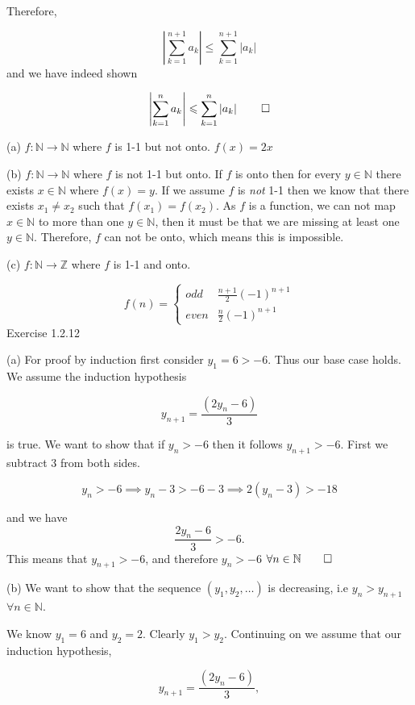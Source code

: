 \documentclass{report}
\begin{document}
Therefore,

$$
\left|\sum_{k=1}^{n+1} a_{k}\right| \leq \sum_{k=1}^{n+1}\left|a_{k}\right| $$  and we have indeed shown

$$
\left|\sum_{k=1}^{n} a_{k}\right| \leq \sum_{k=1}^{n}\left|a_{k}\right| \qed$$

\bigskip
{}
(a) $f: \mathbb{N} \rightarrow \mathbb{N}$ where $f$ is 1-1 but not onto. 
\sol  $f(x) = 2x$
\par
(b) $f: \mathbb{N} \rightarrow \mathbb{N}$ where $f$ is not 1-1 but onto. 
\sol If $f$ is onto then for every $y \in \mathbb{N}$ there exists $x \in \mathbb{N}$ where $f(x) = y$. If we assume $f$  is \textit{not} 1-1 then we know that there exists $x_1 \neq x_2$ such that $f(x_1) = f(x_2)$. As $f$ is a function, we can not map $x \in \mathbb{N}$ to more than one $y \in \mathbb{N}$, then it must be that we are missing at least one $y \in \mathbb{N}$. Therefore, $f$ can not be onto, which means this is impossible.

(c) $f: \mathbb{N} \rightarrow \mathbb{Z}$ where $f$ is 1-1 and onto. 

\sol  
\[ 
 f(n) = 
  \begin{cases} 
  odd & \frac{n+1}{2} (-1)^{n+1} \\
  even & \frac{n}{2} (-1)^{n+1}
   \end{cases}
\]
\bigskip
\qs{}
{Exercise 1.2.12}

(a) \sol For proof by induction first consider $y_1 = 6 > -6$. Thus our base case holds. 
We assume the induction hypothesis

\begin{equation}
y_{n+1}  = \frac{(2y_n -6 )}{3}
\end{equation}

is true.  We want to show that if $y_n >-6$ then it follows $y_{n+1} > -6$. First we subtract 3 from both sides.

$$y_n > -6 \implies  y_n -3  > -6 -3 \implies  2(y_n -3)  > -18$$

and we have
$$
\frac{2y_n -6 }{3} > -6.
$$
This means that $y_{n+1} > -6$, and therefore $y_n > -6$ $\forall n \in \mathbb{N} \qed$
\smallskip

(b) \sol We want to show that the sequence $(y_1, y_2, \dots)$ is decreasing, i.e $ y_{n} > y_{n+1}$ $\forall n \in \mathbb{N}$.

We know $y_1 = 6$ and $y_2 = 2$. Clearly $y_1 > y_2$. Continuing on we assume that our induction hypothesis,

$$ y_{n+1}  = \frac{(2y_n -6 )}{3}, $$ 
\end{document}
